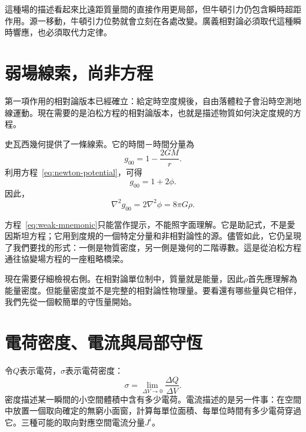 \begin{classroomqa}
\end{classroomqa}

這種場的描述看起來比遠距質量間的直接作用更局部，但牛頓引力仍包含瞬時超距作用。源一移動，牛頓引力位勢就會立刻在各處改變。廣義相對論必須取代這種瞬時響應，也必須取代力定律。

\section{弱場線索，尚非方程}

第一項作用的相對論版本已經確立：給定時空度規後，自由落體粒子會沿時空測地線運動。現在需要的是泊松方程的相對論版本，也就是描述物質如何決定度規的方程。

史瓦西幾何提供了一條線索。它的時間－時間分量為
\begin{equation}
 g_{00}=1-\frac{2GM}{r}.
\end{equation}
利用方程~\eqref{eq:newton-potential}，可得
\begin{equation}
 g_{00}=1+2\phi.
\end{equation}
因此，
\begin{equation}
 \nabla^2g_{00}=2\nabla^2\phi=8\pi G\rho.
 \label{eq:weak-mnemonic}
\end{equation}

方程~\eqref{eq:weak-mnemonic}只能當作提示，不能照字面理解。它是助記式，不是愛因斯坦方程；它用到度規的一個特定分量和非相對論性的源。儘管如此，它仍呈現了我們要找的形式：一側是物質密度，另一側是幾何的二階導數。這是從泊松方程通往協變場方程的一座粗略橋梁。

現在需要仔細檢視右側。在相對論單位制中，質量就是能量，因此\(\rho\)首先應理解為能量密度。但能量密度並不是完整的相對論性物理量。要看還有哪些量與它相伴，我們先從一個較簡單的守恆量開始。

\section{電荷密度、電流與局部守恆}

令\(Q\)表示電荷，\(\sigma\)表示電荷密度：
\begin{equation}
 \sigma=\lim_{\Delta V\to0}\frac{\Delta Q}{\Delta V}.
\end{equation}
密度描述某一瞬間的小空間體積中含有多少電荷。電流描述的是另一件事：在空間中放置一個取向確定的無窮小面窗，計算每單位面積、每單位時間有多少電荷穿過它。三種可能的取向對應空間電流分量\(J^i\)。

